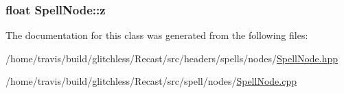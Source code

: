\hypertarget{class_spell_node_aff090331ff1bd816a22e974a50c1a180}{
\subsubsection[{z}]{\setlength{\rightskip}{0pt plus 5cm}float Spell\-Node\-::z\hspace{0.3cm}{\ttfamily [protected]}}}\label{class_spell_node_aff090331ff1bd816a22e974a50c1a180}


The documentation for this class was generated from the following files\-:\begin{DoxyCompactItemize}
\item 
/home/travis/build/glitchless/\-Recast/src/headers/spells/nodes/\hyperlink{_spell_node_8hpp}{Spell\-Node.\-hpp}\item 
/home/travis/build/glitchless/\-Recast/src/spell/nodes/\hyperlink{_spell_node_8cpp}{Spell\-Node.\-cpp}\end{DoxyCompactItemize}
